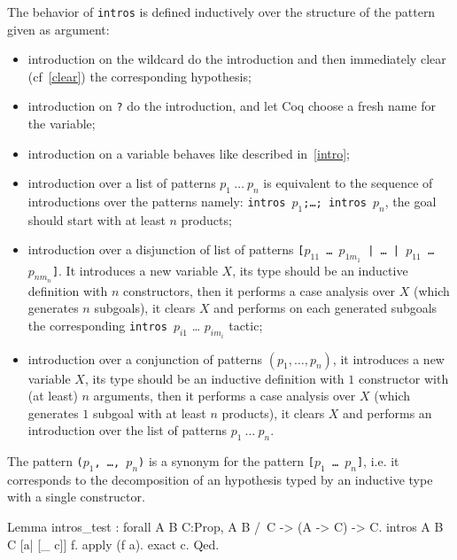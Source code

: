 The behavior of \texttt{intros} is defined inductively over the
structure of the pattern given as argument:
\begin{itemize}
\item introduction on the wildcard do the introduction and then
  immediately clear (cf~\ref{clear}) the corresponding hypothesis;
\item introduction on \texttt{?} do the introduction, and let Coq
  choose a fresh name for the variable;
\item introduction on a variable behaves like described in~\ref{intro}; 
\item introduction over a
list of patterns $p_1~\ldots~p_n$ is equivalent to the sequence of
introductions over the patterns namely:
\texttt{intros $p_1$;\ldots; intros $p_n$}, the goal should start with
at least $n$ products;
\item introduction over a
disjunction of list of patterns
{\tt [$p_{11}$ {\ldots} $p_{1m_1}$ | {\ldots} | $p_{11}$ {\ldots} $p_{nm_n}$]}. It introduces a new variable $X$, its type should be an inductive
definition with $n$
constructors, then it performs a case analysis over $X$ 
(which generates $n$ subgoals), it 
clears $X$ and performs on each generated subgoals the corresponding
\texttt{intros}~$p_{i1}$ {\ldots} $p_{im_i}$ tactic;
\item introduction over a 
conjunction  of patterns $(p_1,\ldots,p_n)$, it
introduces a new variable $X$, its type should be an inductive 
definition with $1$
constructor with (at least) $n$ arguments, then it performs a case 
analysis over $X$ 
(which generates $1$ subgoal with at least $n$ products), it 
clears $X$ and performs an introduction over the list of patterns $p_1~\ldots~p_n$.
\end{itemize}

\Rem The pattern {\tt ($p_1$, {\ldots}, $p_n$)}
is a synonym for the pattern {\tt [$p_1$ {\ldots} $p_n$]}, i.e. it
corresponds to the decomposition of an hypothesis typed by an
inductive type with a single constructor.

\begin{coq_example}
Lemma intros_test : forall A B C:Prop, A \/ B /\ C -> (A -> C) -> C.
intros A B C [a| [_ c]] f.
apply (f a).
exact c.
Qed.
\end{coq_example}



